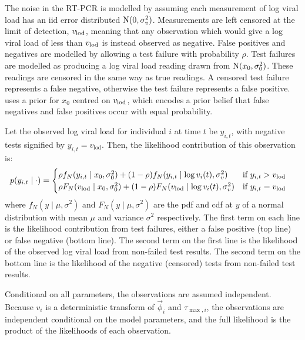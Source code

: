 \documentclass[thesis.tex]{subfiles}
\begin{document}
The noise in the RT-PCR is modelled by assuming each measurement of log viral load has an iid error distributed $\operatorname{N}(0, \sigma_v^2)$.
Measurements are left censored at the limit of detection, $v_\text{lod}$, meaning that any observation which would give a log viral load of less than $v_\text{lod}$ is instead observed as negative.
False positives and negatives are modelled by allowing a test failure with probability $\rho$.
Test failures are modelled as producing a log viral load reading drawn from $\operatorname{N}(x_0, \sigma_0^2)$.
These readings are censored in the same way as true readings.
A censored test failure represents a false negative, otherwise the test failure represents a false positive.
\textcite{hakkiOnset} uses a prior for $x_0$ centred on $v_\text{lod}$, which encodes a prior belief that false negatives and false positives occur with equal probability.

Let the observed log viral load for individual $i$ at time $t$ be $y_{i,t}$, with negative tests signified by $y_{i,t}=v_\text{lod}$.
Then, the likelihood contribution of this observation is:
\begin{align}
p(y_{i,t} \mid \cdot) &= \begin{cases}
    \rho f_N(y_{i,t} \mid x_0, \sigma_0^2) + (1 - \rho) f_N(y_{i,t} \mid \log v_i(t), \sigma_v^2) & \text{if $y_{i,t} > v_\text{lod}$}\\
    \rho F_N(v_\text{lod} \mid x_0, \sigma_0^2) + (1 - \rho) F_N(v_\text{lod} \mid \log v_i(t), \sigma_v^2) & \text{if $y_{i,t} = v_\text{lod}$} \label{ATACCC:eq:hakki-likelihood}
\end{cases}
\end{align}
where $f_N(y \mid \mu, \sigma^2)$ and $F_N(y \mid \mu, \sigma^2)$ are the pdf and cdf at $y$ of a normal distribution with mean $\mu$ and variance $\sigma^2$ respectively.
The first term on each line is the likelihood contribution from test failures, either a false positive (top line) or false negative (bottom line).
The second term on the first line is the likelihood of the observed log viral load from non-failed test results.
The second term on the bottom line is the likelihood of the negative (censored) tests from non-failed test results.

Conditional on all parameters, the observations are assumed independent.
Because $v_i$ is a deterministic transform of $\vec{\phi}_i$ and $\tau_{\max,i}$, the observations are independent conditional on the model parameters, and the full likelihood is the product of the likelihoods of each observation.
\end{document}
